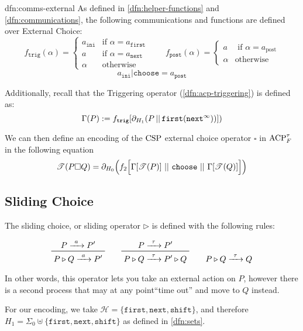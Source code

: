\documentclass[../hons_project.tex]{subfiles}
\begin{document}
\begin{dfn}{dfn:comms-external}{}
	As defined in \ref{dfn:helper-functions} and \ref{dfn:communications}, the following communications and functions are defined over External Choice:
	\[f_{\mathtt{trig}}(\alpha) = \begin{cases}
			a_{\mathtt{ini}} & \text{if } \alpha = a_{\mathtt{first}} \\
			a                & \text{if } \alpha = a_{\mathtt{next}}  \\
			\alpha           & \text{otherwise}
		\end{cases} \qquad f_{\mathtt{post}}(\alpha) = \begin{cases}
			a      & \text{ if } \alpha = a_{\mathrm{post}} \\
			\alpha & \text{otherwise}
		\end{cases}
	\]
	\[
		a_{\mathtt{ini}} | \mathtt{choose} = a_{\mathtt{post}}
	\]
	\longrule{0.08ex}

	Additionally, recall that the Triggering operator (\ref{dfn:acp-triggering}) is defined as:
	\[\Gamma(P) := f_{\mathtt{trig}}[\partial_{H_{1}}(P \merge \mathtt{first}(\mathtt{next}^{\infty}))])\]
\end{dfn}


We can then define an encoding of the $\csp$ external choice operator $\square$ in $\acptf$ in the following equation
\[\trans{P \square Q} = \partial_{H_{0}}\Bigl(f_{2}\Bigl[\Gamma[\trans{P}]\, \merge \,\mathtt{choose}\, \merge \,\Gamma[\trans{Q}]\Bigl]\Bigr)\]

\subsection{Sliding Choice}\label{ssec:sliding-choice}
The sliding choice, or sliding operator $\triangleright$ is defined with the following rules:

\[\prftree{P \prightarrow{a} P'}{P \triangleright Q \prightarrow{a} P'} \qquad \prftree{P \prightarrow{\tau} P'}{P \triangleright Q \prightarrow{\tau} P' \triangleright Q} \qquad P \triangleright Q \prightarrow{\tau} Q\]

In other words, this operator lets you take an external action on $P$, however there is a second process that may at any point``time out'' and move to $Q$ instead.

For our encoding, we take $\mathscr{H} = \{\mathtt{first}, \mathtt{next}, \mathtt{shift}\}$, and therefore $H_{1} = \Sigma_{0} \uplus \{\mathtt{first}, \mathtt{next}, \mathtt{shift}\}$ as defined in \ref{dfn:sets}.
\end{document}
